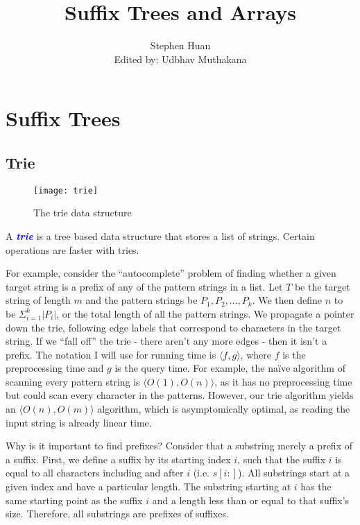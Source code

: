 \documentclass[11pt, oneside]{article}
\title{Suffix Trees and Arrays}
\author{Stephen Huan \\ Edited by: Udbhav Muthakana}
\newcommand{\emphasis}[1]{\textcolor{blue}{\textbf{\textit{#1}}}}
\begin{document}
\maketitle

\section{Suffix Trees}
\subsection{Trie}

\begin{figure}[h!]
\centering
\texttt{[image: trie]}
\caption{The trie data structure}
\end{figure}

A \emphasis{trie} is a tree based data structure that stores a list of strings.
Certain operations are faster with tries.

For example, consider the ``autocomplete'' problem of finding whether a given target string is a prefix of any of the pattern strings in a list.
Let \( T \) be the target string of length \( m \) and the pattern strings be \( P_1, P_2, \dots, P_k \).
We then define \( n \) to be \( \Sigma^{k}_{i = 1} |P_i| \), or the total length of all the pattern strings.
We propagate a pointer down the trie, following edge labels that correspond to characters in the target string.
If we ``fall off'' the trie - there aren't any more edges - then it isn't a prefix.
The notation I will use for running time is \( \langle f, g \rangle \),
where \( f \) is the preprocessing time and \( g \) is the query time.
For example, the naïve algorithm of scanning every pattern string
is \( \langle O(1), O(n) \rangle \), as it has no preprocessing time
but could scan every character in the patterns.
However, our trie algorithm yields an \( \langle O(n), O(m) \rangle \) algorithm,
which is asymptomically optimal, as reading the input string is already linear time.

Why is it important to find prefixes? Consider that a substring merely a prefix of a suffix.
First, we define a suffix by its starting index \( i \), such that the suffix \( i \)
is equal to all characters including and after \( i \) (i.e. \( s[i:] \)). All substrings
start at a given index and have a particular length. The substring starting at \( i \) has the same starting point as the suffix \( i \) and a length less than or equal to that suffix's size. Therefore,
all substrings are prefixes of suffixes.
\end{document}
